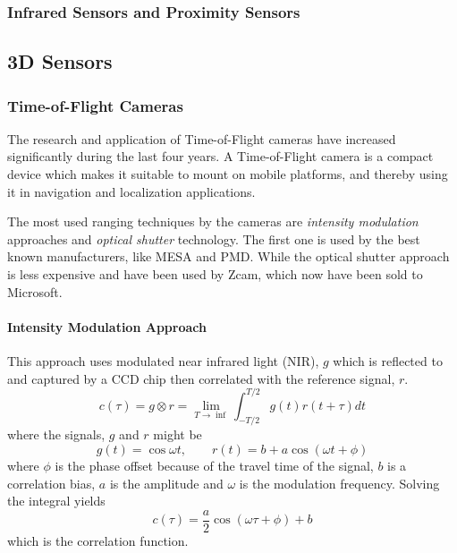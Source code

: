 \subsubsection{Infrared Sensors and Proximity Sensors}


\subsection{3D Sensors}


\subsubsection{Time-of-Flight Cameras}
The research and application of Time-of-Flight cameras have increased significantly during the last four
years. A Time-of-Flight camera is a compact device which makes it suitable to mount on
mobile platforms, and thereby using it in navigation and localization applications. 

The most used ranging techniques by the cameras are \emph{intensity modulation} approaches and
\emph{optical shutter} technology. The first one is used by the best known manufacturers,
like MESA and PMD. While the optical shutter approach is less expensive and have been used
by Zcam, which now have been sold to Microsoft. 


\paragraph{Intensity Modulation Approach}
This approach uses modulated near infrared light (NIR), $g$ which is reflected to and
captured by a CCD chip then correlated with the reference signal, $r$. 
\begin{equation}
    c(\tau) = g \otimes r = \lim_{T \rightarrow \inf} \int^{T/2}_{-T/2} g(t) r(t + \tau) dt
\end{equation}
where the signals, $g$ and $r$ might be
\begin{equation}
    g(t) = \cos{\omega t}, \quad \quad r(t) = b + a \cos{(\omega t + \phi)}
\end{equation}
where $\phi$ is the phase offset because of the travel time of the signal, $b$ is a
correlation bias, $a$ is the amplitude and $\omega$ is the modulation frequency. Solving
the integral yields 
\begin{equation}
    c(\tau) = \frac{a}{2} \cos{(\omega \tau + \phi )} + b
\end{equation}
which is the correlation function. 

